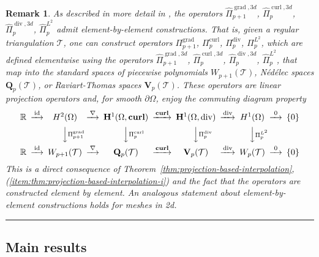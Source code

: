 \documentclass{article}
\newtheorem{remark}[theorem]{Remark}
\newcommand{\hatPicurlcom}{\widehat \Pi^{\operatorname*{curl},3d}_p}
\newcommand{\hatPigradcom}{\widehat\Pi^{\operatorname*{grad},3d}_{p+1}}
\newcommand{\hatPidivcom}{\widehat\Pi^{\operatorname*{div},3d}_{p}}
\newcommand{\eremk}{\hbox{}\hfill\rule{0.8ex}{0.8ex}}
\begin{document}
\begin{remark}
\label{item:thm:projection-based-interpolation-ii}
As described in more detail in \cite[Sec.~{8}]{melenk-sauter18}, the operators 
$\hatPigradcom$, $\hatPicurlcom$, $\hatPidivcom$,
$\widehat{\Pi}_{p}^{L^{2}}$ admit element-by-element constructions. That is,
given a regular triangulation ${\mathcal T}$, one can construct 
operators $\Pi
_{p+1}^{\operatorname*{grad}}$, $\Pi_{p}^{\operatorname*{curl}}$, $\Pi
_{p}^{\operatorname*{div}}$, $\Pi_{p}^{L^{2}}$, which are defined elementwise 
using the operators
$\hatPigradcom$, $\hatPicurlcom$, $\hatPidivcom$,
$\widehat{\Pi}_{p}^{L^{2}}$, that map into the standard spaces of piecewise 
polynomials $W_{p+1}({\mathcal T})$, N\'ed\'elec spaces ${\mathbf Q}_p({\mathcal T})$, or Raviart-Thomas spaces ${\mathbf V}_p({\mathcal T})$. 
These operators are linear projection operators and, for 
smooth $\partial\Omega$, enjoy  the commuting diagram property 
\begin{equation*}
\minCDarrowwidth15pt
\begin{CD} \mathbb{R} @> \operatorname*{id} >> H^2(\Omega) @> \nabla >> \mathbf{H}^1(\Omega, \operatorname*{\mathbf{curl}}) @> \operatorname*{\mathbf{curl}} >> \mathbf{H}^1(\Omega, \operatorname*{div}) @> \operatorname*{div} >> H^1(\Omega) @> \operatorname*{0} >> \{0\}\\ @. @VV \Pi^{\operatorname*{grad}}_{p+1} V @VV \Pi^{\operatorname*{curl}}_p V @VV \Pi^{\operatorname*{div}}_{p} V @VV \Pi^{L^2}_p V \\ \mathbb{R} @> \operatorname*{id} >> W_{p+1}(\mathcal{T}) @> \nabla >> {\mathbf Q}_p(\mathcal{T}) @> \operatorname*{\mathbf{curl}} >> {\mathbf V}_p(\mathcal{T}) @> \operatorname*{div} >> W_p(\mathcal{T}) @> \operatorname*{0} >>\{0\}\end{CD}  
\label{eq:commuting-diagram-global}%
\end{equation*}
This is a direct consequence of Theorem~\ref{thm:projection-based-interpolation}, (\ref{item:thm:projection-based-interpolation-i}) and the fact that the operators are constructed element by element.
%
An analogous statement about element-by-element constructions holds for meshes in 2d. 
\eremk
\end{remark}
\subsection{Main results}

\end{document}
